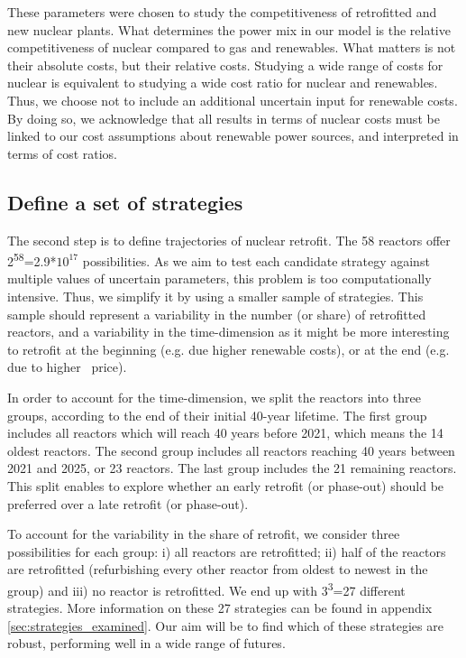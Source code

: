 These parameters were chosen to study the competitiveness of retrofitted and new nuclear plants. What determines the power mix in our model is the relative competitiveness of nuclear compared to gas and renewables. What matters is not their absolute costs, but their relative costs.
Studying a wide range of costs for nuclear is equivalent to studying a wide cost ratio for nuclear and renewables.
Thus, we choose not to include an additional uncertain input for renewable costs. By doing so, we acknowledge that all results in terms of nuclear costs must be linked to our cost assumptions about renewable power sources, and interpreted in terms of cost ratios.


\subsection{Define a set of strategies}

The second step is to define trajectories of nuclear retrofit. The 58 reactors offer 2\textsuperscript{58}=2.9*$10^{17}$ possibilities. As we aim to test each candidate strategy against multiple values of uncertain parameters, this problem is too computationally intensive. Thus, we simplify it by using a smaller sample of strategies. This sample should represent a variability in the number (or share) of retrofitted reactors, and a variability in the time-dimension as it might be more interesting to retrofit at the beginning (e.g. due higher renewable costs), or at the end (e.g. due to higher \coo\ price).

In order to account for the time-dimension, we split the reactors into three groups, according to the end of their initial 40-year lifetime. The first group includes all reactors which will reach 40 years before 2021, which means the 14 oldest reactors. The second group includes all reactors reaching 40 years between 2021 and 2025, or 23 reactors. The last group includes the 21 remaining reactors. This split enables to explore whether an early retrofit (or phase-out) should be preferred over a late retrofit (or phase-out). 

To account for the variability in the share of retrofit, we consider three possibilities for each group: i) all reactors are retrofitted; ii) half of the reactors are retrofitted (refurbishing every other reactor from oldest to newest in the group) and iii) no reactor is retrofitted. We end up with 3\textsuperscript{3}=27 different strategies. 
More information on these 27 strategies can be found in appendix \ref{sec:strategies_examined}. Our aim will be to find which of these strategies are robust, performing well in a wide range of futures. 

